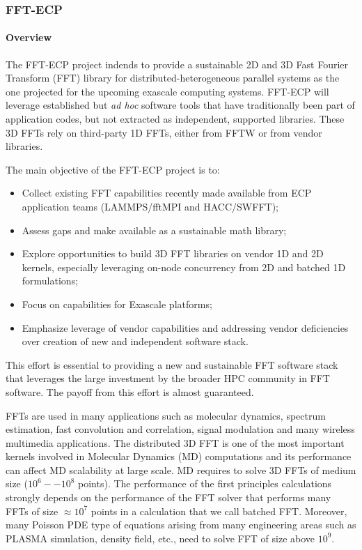\subsubsection{ FFT-ECP}\label{subsubsect:fftecp}


\paragraph{Overview}

The FFT-ECP project indends to provide a sustainable 2D and 3D Fast Fourier 
Transform (FFT) library 
for distributed-heterogeneous parallel systems as the one projected for 
the upcoming exascale computing systems. FFT-ECP will leverage
established but {\it ad hoc} 
software tools that have traditionally been part of application 
codes, but not extracted as independent, supported libraries. 
These 3D FFTs rely on third-party 1D FFTs, either from FFTW or 
from vendor libraries.

The main objective of the FFT-ECP project is to:
\begin{itemize}
\item Collect existing FFT capabilities recently made available from ECP 
      application teams (LAMMPS/fftMPI and HACC/SWFFT);
\item Assess gaps and make available as a sustainable math library;
\item Explore opportunities to build 3D FFT libraries on vendor 1D and 
      2D kernels, especially leveraging on-node concurrency from 2D and 
      batched 1D formulations;
\item Focus on capabilities for Exascale platforms;
\item Emphasize leverage of vendor capabilities and addressing vendor 
      deficiencies over creation of new and independent software stack.
\end{itemize}

This effort is 
essential to providing a new and sustainable FFT software stack that 
leverages the large investment by the broader HPC community in FFT 
software. The payoff from this effort is almost guaranteed. 

FFTs are used in many applications such as molecular dynamics, 
spectrum estimation, fast convolution and correlation, signal 
modulation and many wireless multimedia applications. The 
distributed 3D FFT is one of the most important kernels involved 
in Molecular Dynamics (MD) computations and its performance can 
affect MD scalability at large scale. MD requires to solve 3D FFTs 
of medium size ($10^6--10^8$ points). The performance of the first 
principles calculations strongly depends on the performance of the 
FFT solver that performs many FFTs of size $\approx 10^7$ points in 
a calculation that we call batched FFT. Moreover, many Poisson PDE 
type of equations arising from many engineering areas such as PLASMA 
simulation, density field, etc., need to solve FFT of size above $10^9$. 

